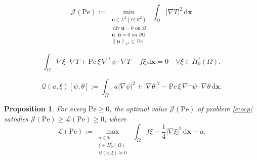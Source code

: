\documentclass[10pt,a4paper]{amsart}
\newtheorem{proposition}{Proposition}
\newcommand{\Pe}{\mathrm{Pe}}
\newcommand{\QF}{\mathcal{Q}}
\newcommand{\R}{\mathbb{R}}
\newcommand{\abs}[1]{\left\vert #1 \right\vert}
\newcommand{\avg}[1]{\int_\Omega #1 \,\dx}
\renewcommand{\div}{\divergence}%
\DeclareMathOperator{\divergence}{div}
\newcommand{\dx}{\mathrm{d} \vec{x}}
\newcommand{\lb}{\mathcal{L}}
\newcommand{\norm}[1]{\left\| #1 \right\|}
\newcommand{\ocpval}{\mathcal{J}}
\renewcommand{\vec}[1]{\mathbf{#1}}
\begin{document}
\begin{equation}\label{e:ocp}\tag{OCP}
    \ocpval(\Pe):=
    \min_{\substack{
        \vec{u}\in L^2(\Omega;\R^2) \\ 
        \div\vec{u}=0 \text{ on }\Omega\\ 
        \vec{u} \cdot \hat{\vec{n}} = 0  \text{ on }\partial\Omega\\
        \norm{\vec{u}}_{L^2} \leq \,\Pe
    }}\;
    \avg{\abs{\nabla T}^2}
\end{equation}

\begin{equation}\label{e:ade-weak}
    \avg{ \nabla \xi \cdot \nabla T + \Pe\,\xi \,\nabla^\perp \psi \cdot \nabla T - f\xi}= 0 \quad \forall \xi \in H^1_0(\Omega).
\end{equation}

\begin{equation}\label{e:qf}
    \mathcal{Q}\left(a,\xi\right)[\psi,\theta] := \avg{ a|\nabla \psi|^2 + \abs{\nabla\theta}^2 - \Pe\,\xi\, \nabla^\perp \psi \cdot \nabla \theta}.
\end{equation}

\begin{proposition}\label{th:duality}
    For every $\Pe\geq 0$, 
    the optimal value $\ocpval(\Pe)$ of problem \cref{e:ocp} satisfies $\ocpval(\Pe) \geq \lb(\Pe) \geq 0$, where
    \begin{equation}\label{e:ldp}\tag{LDP}
        \lb(\Pe) := \max_{\substack{
            a\in \R \\ 
            \xi \in H^1_0(\Omega) \\ 
            \QF\left(a,\xi\right) \succeq  0 
        }}\;
        \avg{f\xi - \frac14 \abs{\nabla \xi}^2} - a.
    \end{equation}
\end{proposition}
\end{document}

